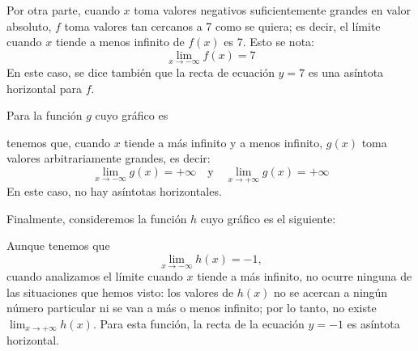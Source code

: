 \documentclass[../teoria.root.tex]{subfiles}
\begin{document}
Por otra parte, cuando \(x\) toma valores negativos suficientemente grandes en valor absoluto, \(f\) toma valores tan cercanos a 7 como se quiera;
es decir, el límite cuando \(x\) tiende a menos infinito de \(f(x)\) es 7.
Esto se nota:
\[\lim_{x\to-\infty}f(x)=7\]
En este caso, se dice también que la recta de ecuación \(y=7\) es una asíntota horizontal para \(f\).

Para la función \(g\) cuyo gráfico es
\begin{center}
\end{center}
tenemos que, cuando \(x\) tiende a más infinito y a menos infinito, \(g(x)\) toma valores arbitrariamente grandes, es decir:
\[\lim_{x\to-\infty}g(x)=+\infty\quad\text{y}\quad\lim_{x\to+\infty}g(x)=+\infty\]
En este caso, no hay asíntotas horizontales.

Finalmente, consideremos la función \(h\) cuyo gráfico es el siguiente:
\begin{center}
\end{center}
Aunque tenemos que
\[\lim_{x\to-\infty}h(x)=-1,\]
cuando analizamos el límite cuando \(x\) tiende a más infinito, no ocurre ninguna de las situaciones que hemos visto:
los valores de \(h(x)\) no se acercan a ningún número particular ni se van a más o menos infinito;
por lo tanto, no existe \(\lim_{x\to+\infty}h(x)\).
Para esta función, la recta de la ecuación \(y=−1\) es asíntota horizontal.
\end{document}
